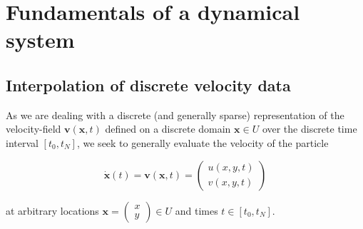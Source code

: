 \documentclass[11pt]{article}
\begin{document}
\section{Fundamentals of a dynamical system}\subsection{Interpolation of discrete velocity data}
As we are dealing with a discrete (and generally sparse) representation of the velocity-field $ \mathbf{v}(\mathbf{x}, t) $ defined on a discrete domain $ \mathbf{x} \in U $ over the discrete time interval $ [t_0, t_N] $, we seek to generally evaluate the velocity of the particle

\begin{equation} \mathbf{\dot{x}}(t)= \mathbf{v}(\mathbf{x}, t) = \begin{pmatrix} u(x, y, t) \\ v(x, y, t) \label{eq: dxdt} \end{pmatrix} \end{equation} 

at arbitrary locations $ \mathbf{x}=\begin{pmatrix} x \\ y \end{pmatrix} \in U $ and times $ t \in [t_0, t_N] $.
\end{document}
